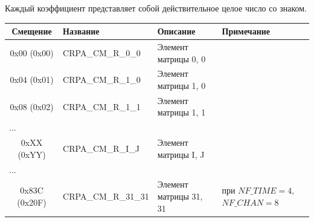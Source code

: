 Каждый коэффициент представляет собой действительное целое число со знаком.

\begin{longtable}{|c|p{3.5cm}|p{5cm}|p{4cm}|}
\hline
\textbf{Смещение} & \textbf{Название} & \textbf{Описание} & \textbf{Примечание} \\
\hline
0x00  (0x00) & CRPA\_CM\_R\_0\_0  & Элемент матрицы 0, 0 &  \\
\hline
0x04  (0x01) & CRPA\_CM\_R\_1\_0  & Элемент матрицы 1, 0 &  \\
\hline
0x08  (0x02) & CRPA\_CM\_R\_1\_1  & Элемент матрицы 1, 1 &  \\
\hline
\multicolumn{4}{|l|}{...} \\
\hline
0xXX  (0xYY) & CRPA\_CM\_R\_I\_J  & Элемент матрицы I, J &  \\
\hline
\multicolumn{4}{|l|}{...} \\
\hline
0x83C (0x20F) & CRPA\_CM\_R\_31\_31& Элемент матрицы 31, 31 & при $NF\_TIME=4$, $NF\_CHAN=8$ \\
\hline
\end{longtable}


